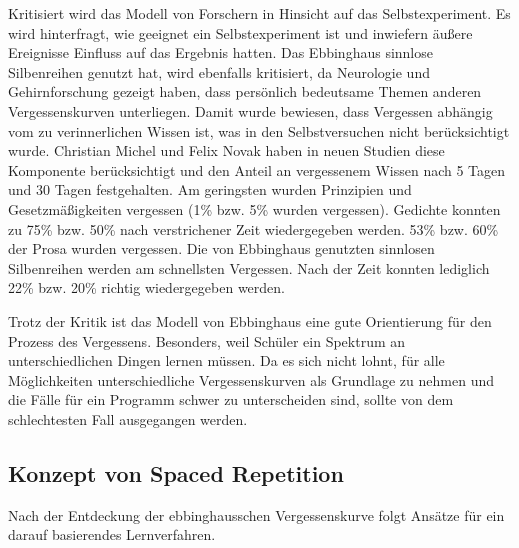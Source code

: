 Kritisiert wird das Modell von Forschern in Hinsicht auf das Selbstexperiment. Es wird hinterfragt, wie geeignet ein Selbstexperiment ist und inwiefern äußere Ereignisse Einfluss auf das Ergebnis hatten. Das Ebbinghaus sinnlose Silbenreihen genutzt hat, wird ebenfalls kritisiert, da Neurologie und Gehirnforschung gezeigt haben, dass persönlich bedeutsame Themen anderen Vergessenskurven unterliegen. Damit wurde bewiesen, dass Vergessen abhängig vom zu verinnerlichen Wissen ist, was in den Selbstversuchen nicht berücksichtigt wurde. Christian Michel und Felix Novak haben in neuen Studien diese Komponente berücksichtigt und den Anteil an vergessenem Wissen nach 5 Tagen und 30 Tagen festgehalten. Am geringsten wurden Prinzipien und Gesetzmäßigkeiten vergessen (1\% bzw. 5\% wurden vergessen). Gedichte konnten zu 75\% bzw. 50\% nach verstrichener Zeit wiedergegeben werden. 53\% bzw. 60\% der Prosa wurden vergessen. Die von Ebbinghaus genutzten sinnlosen Silbenreihen werden am schnellsten Vergessen. Nach der Zeit konnten lediglich 22\% bzw. 20\% richtig wiedergegeben werden.\cite{Wiki:Vergessenskurve}

Trotz der Kritik ist das Modell von Ebbinghaus eine gute Orientierung für den Prozess des Vergessens. Besonders, weil Schüler ein Spektrum an unterschiedlichen Dingen lernen müssen. Da es sich nicht lohnt, für alle Möglichkeiten unterschiedliche Vergessenskurven als Grundlage zu nehmen und die Fälle für ein Programm schwer zu unterscheiden sind, sollte von dem schlechtesten Fall ausgegangen werden.

\subsection{Konzept von Spaced Repetition}
Nach der Entdeckung der ebbinghausschen Vergessenskurve folgt Ansätze für ein darauf basierendes Lernverfahren. 

